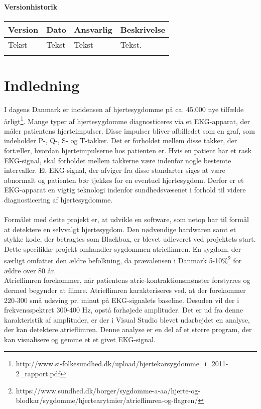 \subsubsection{Versionhistorik}

\begin{longtabu} to 
    Version &    Dato &    Ansvarlig &    Beskrivelse\\[-1ex]
    \midrule
    Tekst &    Tekst &    Tekst &    Tekst.\\
\label{version_Systemark}
\end{longtabu}

\chapter{Indledning}
I dagens Danmark er incidensen af hjertesygdomme på ca. 45.000 nye tilfælde årligt\footnote{http://www.si-folkesundhed.dk/upload/hjertekarsygdomme\_i\_2011-2\_rapport.pdf}. Mange typer af hjertesygdomme diagnosticeres via et EKG-apparat, der måler patientens hjerteimpulser. Disse impulser bliver afbilledet som en graf, som indeholder P-, Q-, S- og T-takker. Det er forholdet mellem disse takker, der fortæller, hvordan hjerteimpulserne hos patienten er. Hvis en patient har et rask EKG-signal, skal forholdet mellem takkerne være indenfor nogle bestemte intervaller. Et EKG-signal, der afviger fra disse standarter siges at være abnormalt og patienten bør tjekkes for en eventuel hjertesygdom. Derfor er et EKG-apparat en vigtig teknologi indenfor sundhedsvæsenet i forhold til videre diagnosticering af hjertesygdomme.\\ \\
Formålet med dette projekt er, at udvikle en software, som netop har til formål at detektere en selvvalgt hjertesygdom. Den nødvendige hardwaren samt et stykke kode, der betragtes som Blackbox, er blevet udleveret ved projektets start.\\
Dette specifikke projekt omhandler sygdommen atrieflimren. En sygdom, der særligt omfatter den ældre befolkning, da prævalensen i Danmark 5-10\%\footnote{https://www.sundhed.dk/borger/sygdomme-a-aa/hjerte-og-blodkar/sygdomme/hjertearytmier/atrieflimren-og-flagren/} for ældre over 80 år.\\
Atrieflimren forekommer, når patientens atrie-kontraktionsmønster forstyrres og dermed begynder at flimre. Atrieflimren karakteriseres ved, at der forekommer 220-300 små udsving pr. minut på EKG-signalets baseline. Desuden vil der i frekvensspektret 300-400 Hz, opstå forhøjede amplituder. Det er ud fra denne karakteristik af amplituder, er der i Visual Studio blevet udarbejdet en analyse, der kan detektere atrieflimren. Denne analyse er en del af et større program, der kan visualisere og gemme et et givet EKG-signal.   

  
